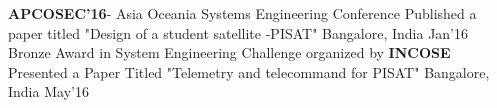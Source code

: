 \begin{cvhonors}
	\cvhonor
	{\textbf{APCOSEC'16}- Asia Oceania Systems Engineering Conference}
	{Published a paper titled "Design of a student satellite -PISAT"}
	{Bangalore, India}
	{Jan'16}
	\cvhonor
	{Bronze Award in System Engineering Challenge organized by \textbf{INCOSE}}
	{Presented a Paper Titled "Telemetry and telecommand for PISAT"}
	{Bangalore, India}
	{May'16}
\end{cvhonors}
